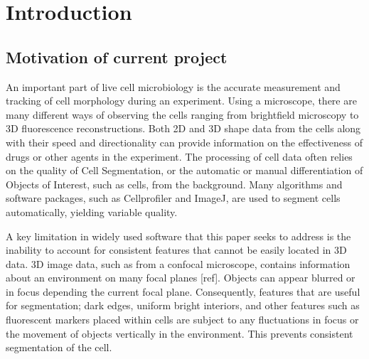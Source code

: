 
\chapter{Introduction}  %

\ifpdf
    \graphicspath{{Chapter1/Figs/Raster/}{Chapter1/Figs/PDF/}{Chapter1/Figs/}}
\else
    \graphicspath{{Chapter1/Figs/Vector/}{Chapter1/Figs/}}
\fi


\section{Motivation of current project}

An important part of live cell microbiology is the accurate measurement and tracking of cell morphology during an experiment. Using a microscope, there are many different ways of observing the cells ranging from brightfield microscopy to 3D fluorescence reconstructions. Both 2D and 3D shape data from the cells along with their speed and directionality can provide information on the effectiveness of drugs or other agents in the experiment. The processing of cell data often relies on the quality of Cell Segmentation, or the automatic or manual differentiation of Objects of Interest, such as cells, from the background. Many algorithms and software packages, such as Cellprofiler and ImageJ, are used to segment cells automatically, yielding variable quality.

A key limitation in widely used software that this paper seeks to address is the inability to account for consistent features that cannot be easily located in 3D data. 3D image data, such as from a confocal microscope, contains information about an environment on many focal planes [ref]. Objects can appear blurred or in focus depending the current focal plane. Consequently, features that are useful for segmentation; dark edges, uniform bright interiors, and other features such as fluorescent markers placed within cells are subject to any fluctuations in focus or the movement of objects vertically in the environment. This prevents consistent segmentation of the cell.

